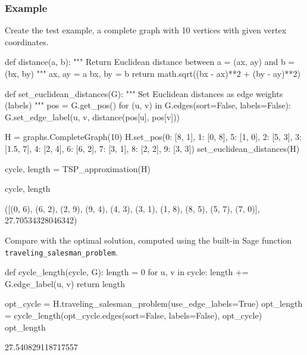 \subsubsection*{Example}

Create the test example, a complete graph with 10 vertices with given vertex coordinates.

\medskip
\begin{sageCell}
def distance(a, b):
    """
    Return Euclidean distance between a = (ax, ay) and b = (bx, by)
    """
    ax, ay = a
    bx, by = b
    return math.sqrt((bx - ax)**2 + (by - ay)**2)

def set_euclidean_distances(G):
    """
    Set Euclidean distances as edge weights (labels)
    """
    pos = G.get_pos()
    for (u, v) in G.edges(sort=False, labels=False):
        G.set_edge_label(u, v, distance(pos[u], pos[v]))

H = graphs.CompleteGraph(10)
H.set_pos({0: [8, 1], 1: [0, 8], 5: [1, 0], 2: [5, 3], 3: [1.5, 7], 4: [2, 4],
  6: [6, 2], 7: [3, 1], 8: [2, 2], 9: [3, 3]})
set_euclidean_distances(H)
\end{sageCell}

\begin{sageCell}
    cycle, length = TSP_approximation(H)
\end{sageCell}
\begin{sageCell}
    cycle, length
\end{sageCell}
\begin{outCell}
   ([(0, 6),
     (6, 2),
     (2, 9),
     (9, 4),
     (4, 3),
     (3, 1),
     (1, 8),
     (8, 5),
     (5, 7),
     (7, 0)], 27.70534328046342)
\end{outCell}

Compare with the optimal solution, computed using the built-in Sage function\\ \verb`traveling_salesman_problem`.

\medskip
\begin{sageCell}
    def cycle_length(cycle, G):
        length = 0
        for u, v in cycle:
            length += G.edge_label(u, v)
        return length

    opt_cycle = H.traveling_salesman_problem(use_edge_labels=True)
    opt_length = cycle_length(opt_cycle.edges(sort=False, labels=False),
      opt_cycle)
    opt_length
\end{sageCell}
\begin{outCell}
    27.540829118717557
\end{outCell}

